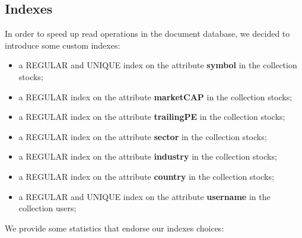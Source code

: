\subsection{Indexes}
In order to speed up read operations in the document database, we decided to
introduce some custom indexes:
\begin{itemize}
    \item a REGULAR and UNIQUE index on the attribute \textbf{symbol} in the collection stocks;
    \item a REGULAR index on the attribute \textbf{marketCAP} in the collection stocks;
    \item a REGULAR index on the attribute \textbf{trailingPE} in the collection stocks;
    \item a REGULAR index on the attribute \textbf{sector} in the collection stocks;
    \item a REGULAR index on the attribute \textbf{industry} in the collection stocks;
    \item a REGULAR index on the attribute \textbf{country} in the collection stocks;
    \item a REGULAR and UNIQUE index on the attribute \textbf{username} in the collection users;
\end{itemize}
We provide some statistics that endorse our indexes choices:
